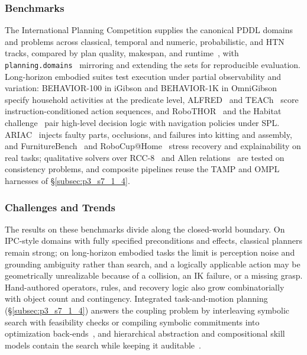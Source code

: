 \subsubsection{Benchmarks}
The International Planning Competition supplies the canonical PDDL domains and problems across classical, temporal and numeric, probabilistic, and HTN tracks, compared by plan quality, makespan, and runtime~\cite{McDermott1998PDDL}, with \texttt{planning.domains}~\cite{PlanningDomains} mirroring and extending the sets for reproducible evaluation. Long-horizon embodied suites test execution under partial observability and variation: BEHAVIOR-100 in iGibson and BEHAVIOR-1K in OmniGibson~\cite{Srivastava2022BEHAVIOR,li2024behavior1k} specify household activities at the predicate level, ALFRED~\cite{shridhar2020alfred} and TEACh~\cite{Padmakumar2022TEACh} score instruction-conditioned action sequences, and RoboTHOR~\cite{Deitke2020RoboTHOR} and the Habitat challenge~\cite{szot2021habitat2} pair high-level decision logic with navigation policies under SPL. ARIAC~\cite{liu2024autonomous} injects faulty parts, occlusions, and failures into kitting and assembly, and FurnitureBench~\cite{Heo2023FurnitureBench} and RoboCup@Home~\cite{Wisspeintner2009RoboCupHome} stress recovery and explainability on real tasks; qualitative solvers over RCC-8~\cite{Randell1992RCC} and Allen relations~\cite{janhunen2019allen} are tested on consistency problems, and composite pipelines reuse the TAMP and OMPL harnesses of §\ref{subsec:p3_s7_1_4}.

\subsubsection{Challenges and Trends}
The results on these benchmarks divide along the closed-world boundary. On IPC-style domains with fully specified preconditions and effects, classical planners remain strong; on long-horizon embodied tasks the limit is perception noise and grounding ambiguity rather than search, and a logically applicable action may be geometrically unrealizable because of a collision, an IK failure, or a missing grasp. Hand-authored operators, rules, and recovery logic also grow combinatorially with object count and contingency. Integrated task-and-motion planning (§\ref{subsec:p3_s7_1_4}) answers the coupling problem by interleaving symbolic search with feasibility checks or compiling symbolic commitments into optimization back-ends~\cite{LozanoPerez2014ConstraintTAMP,garrett2020pddlstream,toussaint2015lgp}, and hierarchical abstraction and compositional skill models contain the search while keeping it auditable~\cite{Garrett2021TAMPReview,Zhao2024TAMPsurvey}.

